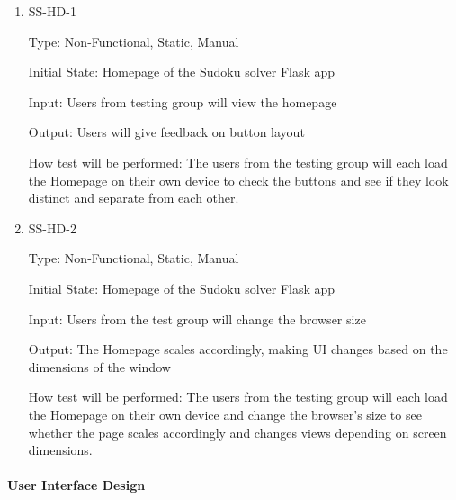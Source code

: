 \documentclass[11pt]{article}
\begin{document}
\begin{enumerate}

\item{SS-HD-1\\}

Type: Non-Functional, Static, Manual
					
Initial State: Homepage of the Sudoku solver Flask app
					
Input: Users from testing group will view the homepage
					
Output: Users will give feedback on button layout
					
How test will be performed: The users from the testing group will each load the Homepage on their own device to check the buttons and see if they look distinct and separate from each other.
					
\item{SS-HD-2\\}

Type: Non-Functional, Static, Manual
					
Initial State: Homepage of the Sudoku solver Flask app
					
Input: Users from the test group will change the browser size
					
Output: The Homepage scales accordingly, making UI changes based on the dimensions of the window
					
How test will be performed: The users from the testing group will each load the Homepage on their own device and change the browser's size to see whether the page scales accordingly and changes views depending on screen dimensions.

\end{enumerate}

\paragraph{User Interface Design}
\end{document}
